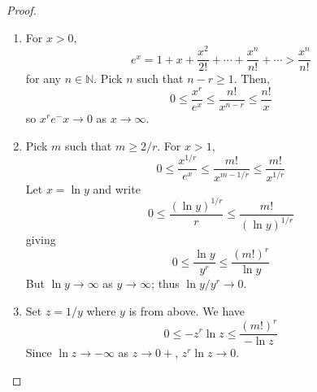 \documentclass[10pt, a4paper, twoside]{report}
\begin{document}
\begin{proof}\item[] 
    \begin{enumerate}
        \item For \(x>0\),
        \[e^x=1+x+\frac{x^2}{2!}+\cdots+\frac{x^n}{n!}+\cdots>\frac{x^n}{n!}\]
        for any \(n\in\mathbb{N}\). Pick \(n\) such that \(n-r\geq 1\). Then,
        \[0\leq\frac{x^r}{e^x}\leq\frac{n!}{x^{n-r}}\leq\frac{n!}{x}\]
        so \(x^re^-x\to 0\) as \(x\to\infty\).
        \item Pick \(m\) such that \(m\geq 2/r\). For \(x>1\),
        \[0\leq\frac{x^{1/r}}{e^x}\leq\frac{m!}{x^{m-1/r}}\leq\frac{m!}{x^{1/r}}\]
        Let \(x=\ln y\) and write 
        \[0\leq\frac{(\ln y)^{1/r}}{r}\leq\frac{m!}{(\ln y)^{1/r}}\]
        giving 
        \[0\leq\frac{\ln y}{y^r}\leq\frac{(m!)^r}{\ln y}\]
        But \(\ln y\to\infty\) as \(y\to\infty\); thus \(\ln y/y^r\to 0\).
        \item Set \(z=1/y\) where \(y\) is from above. We have 
        \[0\leq-z^r\ln z\leq\frac{(m!)^r}{-\ln z}\]
        Since \(\ln z\to-\infty\) as \(z\to 0+\), \(z^r\ln z\to 0\).
    \end{enumerate}
\end{proof}
\end{document}
